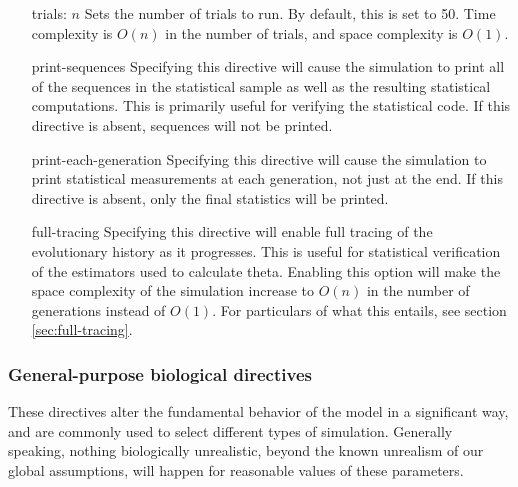 \documentclass{article}
\begin{document}
        \begin{enumerate}
          \item[trials: $n$]
          Sets the number of trials to run. By default, this is set to 50. Time
          complexity is $O(n)$ in the number of trials, and space complexity is
          $O(1)$.

          \item[print-sequences]
          Specifying this directive will cause the simulation to print all of
          the sequences in the statistical sample as well as the resulting
          statistical computations. This is primarily useful for verifying the
          statistical code. If this directive is absent, sequences will not be
          printed.

          \item[print-each-generation]
          Specifying this directive will cause the simulation to print
          statistical measurements at each generation, not just at the end. If
          this directive is absent, only the final statistics will be printed.

          \item[full-tracing]
          Specifying this directive will enable full tracing of the evolutionary
          history as it progresses. This is useful for statistical verification
          of the estimators used to calculate theta. Enabling this option will
          make the space complexity of the simulation increase to $O(n)$ in the
          number of generations instead of $O(1)$. For particulars of what this
          entails, see section \ref{sec:full-tracing}.
        \end{enumerate}

      \subsubsection{General-purpose biological directives}
        \label{sec:general-directives}

        These directives alter the fundamental behavior of the model in a
        significant way, and are commonly used to select different types of
        simulation. Generally speaking, nothing biologically unrealistic, beyond
        the known unrealism of our global assumptions, will happen for
        reasonable values of these parameters.
\end{document}

